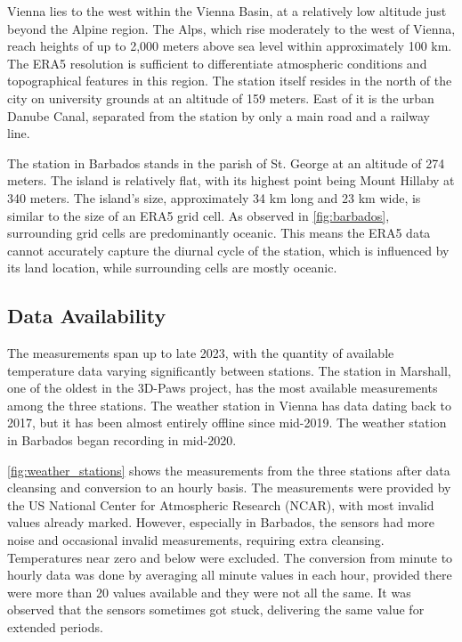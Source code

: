Vienna lies to the west within the Vienna Basin, at a relatively low altitude just beyond the Alpine region. The Alps, which rise moderately to the west of Vienna, reach heights of up to 2,000 meters above sea level within approximately 100 km.
The ERA5 resolution is sufficient to differentiate atmospheric conditions and topographical features in this region.
The station itself resides in the north of the city on university grounds at an altitude of 159 meters.
East of it is the urban Danube Canal, separated from the station by only a main road and a railway line.

The station in Barbados stands in the parish of St. George at an altitude of 274 meters. The island is relatively flat, with its highest point being Mount Hillaby at 340 meters.
The island's size, approximately 34 km long and 23 km wide, is similar to the size of an ERA5 grid cell.
As observed in \autoref{fig:barbados}, surrounding grid cells are predominantly oceanic.
This means the ERA5 data cannot accurately capture the diurnal cycle of the station, which is influenced by its land location, while surrounding cells are mostly oceanic.

\subsection{Data Availability}

The measurements span up to late 2023, with the quantity of available temperature data varying significantly between stations. The station in Marshall, one of the oldest in the 3D-Paws project, has the most available measurements among the three stations. The weather station in Vienna has data dating back to 2017, but it has been almost entirely offline since mid-2019. The weather station in Barbados began recording in mid-2020.

\autoref{fig:weather_stations} shows the measurements from the three stations after data cleansing and conversion to an hourly basis. The measurements were provided by the US National Center for Atmospheric Research (NCAR), with most invalid values already marked. However, especially in Barbados, the sensors had more noise and occasional invalid measurements, requiring extra cleansing. Temperatures near zero and below were excluded. The conversion from minute to hourly data was done by averaging all minute values in each hour, provided there were more than 20 values available and they were not all the same. It was observed that the sensors sometimes got stuck, delivering the same value for extended periods.

